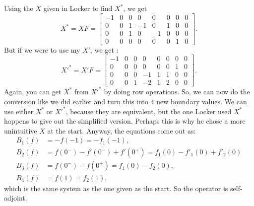 \documentclass[11pt,reqno,oneside,a4paper]{article}
\begin{document}
   Using the $X$ given in Locker to find $X^*$, we get
   $$ X^* = XF = \begin{bmatrix} 
   -1 & 0 & 0 & 0 & 0 & 0 & 0 & 0 \\
   0 & 0 & 1 & -1 & 0 & 1 & 0 & 0 \\
   0 & 0 & 1 & 0 & -1 & 0 & 0 & 0 \\
   0 & 0 & 0 & 0 & 0 & 0 & 1 & 0
   \end{bmatrix}. $$
   But if we were to use my $X'$, we get :
   $$ X'^*= X'F = \begin{bmatrix} 
   -1 & 0 & 0 & 0 & 0 & 0 & 0 & 0 \\
   0 & 0 & 0 & 0 & 0 & 0 & 1 & 0 \\
   0 & 0 & 0 & -1 & 1 & 1 & 0 & 0 \\
   0 & 0 & 1 & -2 & 1 & 2 & 0 & 0 
   \end{bmatrix}. $$
   Again, you can get $X^*$ from $X'^*$ by doing row operations. So, we can now do the conversion like we did earlier and turn this into 4 new boundary values. We can use either $X^*$ or $X'^*$, because they are equivalent, but the one Locker used $X^*$ happens to give out the simplified version. Perhaps this is why he chose a more unintuitive $X$ at the start. Anyway, the equations come out as:
   \begin{align*}
   B_1(f) &= -f(-1) = -f_1(-1),\\
   B_2(f) &= f(0^-) -f'(0^-) +f'(0^+) = f_1(0) - f'_1(0) + f'_2(0)\\
   B_3(f) &= f(0^-)-f(0^+)=f_1(0) -f_2(0),\\
   B_4(f) &= f(1) = f_2(1),
   \end{align*}
   which is the same system as the one given as the start. So the operator is self-adjoint.
   \nocite{*}
   
   
\end{document}
